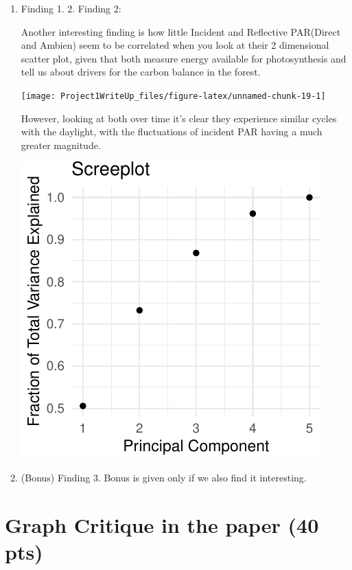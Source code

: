 \documentclass[]{article}
\begin{document}
\begin{enumerate}[label=(\alph*)]
\item Finding 1.
2. Finding 2:
 
Another interesting finding is how little Incident and Reflective PAR(Direct and Ambien) seem to be correlated when you look at their 2 dimensional scatter plot, given that both measure energy available for photosynthesis and tell us about drivers for the carbon balance in the forest.

\begin{center}\texttt{[image: Project1WriteUp\_files/figure-latex/unnamed-chunk-19-1]} \end{center}
However, looking at both over time it's clear they experience similar cycles with the daylight, with the fluctuations of incident PAR having a much greater magnitude.

\begin{center}\includegraphics{Project1WriteUp_files/figure-latex/unnamed-chunk-20-1} \end{center}

\item (Bonus) Finding 3. Bonus is given only if we also find it interesting.
\end{enumerate}

\section{Graph Critique in the paper (40 pts)}
\end{document}
